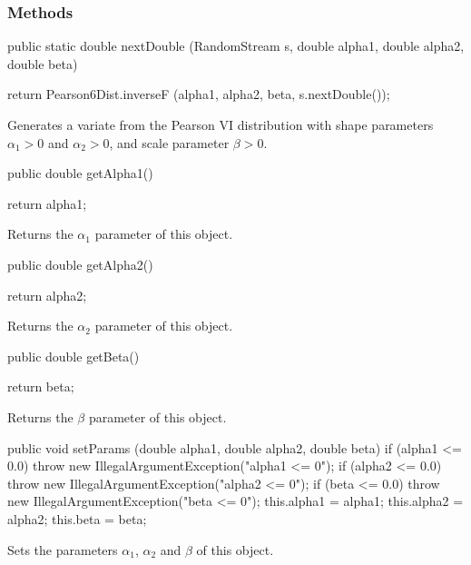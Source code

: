 \subsubsection* {Methods}
\begin{code}

   public static double nextDouble (RandomStream s, double alpha1,
                                    double alpha2, double beta)\begin{hide} {
      return Pearson6Dist.inverseF (alpha1, alpha2, beta, s.nextDouble());
   }\end{hide}
\end{code}
\begin{tabb} Generates a variate from the Pearson VI distribution
   with shape parameters $\alpha_1 > 0$ and $\alpha_2 > 0$, and
   scale parameter $\beta > 0$.
\end{tabb}
\begin{code}

   public double getAlpha1()\begin{hide} {
      return alpha1;
   }\end{hide}
\end{code}
\begin{tabb}
   Returns the $\alpha_1$ parameter of this object.
\end{tabb}
\begin{code}

   public double getAlpha2()\begin{hide} {
      return alpha2;
   }\end{hide}
\end{code}
\begin{tabb}
   Returns the $\alpha_2$ parameter of this object.
\end{tabb}
\begin{code}

   public double getBeta()\begin{hide} {
      return beta;
   }\end{hide}
\end{code}
\begin{tabb}
   Returns the $\beta$ parameter of this object.
\end{tabb}
\begin{hide}\begin{code}
   
   public void setParams (double alpha1, double alpha2, double beta) {
      if (alpha1 <= 0.0)
         throw new IllegalArgumentException("alpha1 <= 0");
      if (alpha2 <= 0.0)
         throw new IllegalArgumentException("alpha2 <= 0");
      if (beta <= 0.0)
         throw new IllegalArgumentException("beta <= 0");
      this.alpha1 = alpha1;
      this.alpha2 = alpha2;
      this.beta = beta;
   }
\end{code}
\begin{tabb}
   Sets the parameters $\alpha_1$, $\alpha_2$ and $\beta$ of this object.
\end{tabb}
\begin{code}
}
\end{code}
\end{hide}
